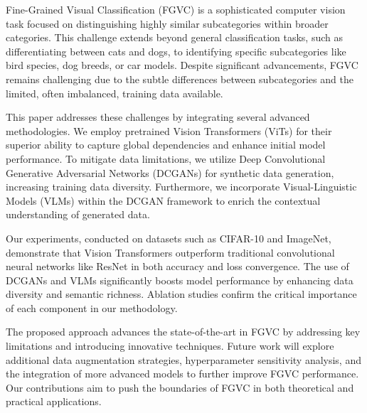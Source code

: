 \begin{onecolabstract}
    Fine-Grained Visual Classification (FGVC) is a sophisticated computer vision task focused on distinguishing highly similar subcategories within broader categories. This challenge extends beyond general classification tasks, such as differentiating between cats and dogs, to identifying specific subcategories like bird species, dog breeds, or car models. Despite significant advancements, FGVC remains challenging due to the subtle differences between subcategories and the limited, often imbalanced, training data available.

    This paper addresses these challenges by integrating several advanced methodologies. We employ pretrained Vision Transformers (ViTs) for their superior ability to capture global dependencies and enhance initial model performance. To mitigate data limitations, we utilize Deep Convolutional Generative Adversarial Networks (DCGANs) for synthetic data generation, increasing training data diversity. Furthermore, we incorporate Visual-Linguistic Models (VLMs) within the DCGAN framework to enrich the contextual understanding of generated data.

    Our experiments, conducted on datasets such as CIFAR-10 and ImageNet, demonstrate that Vision Transformers outperform traditional convolutional neural networks like ResNet in both accuracy and loss convergence. The use of DCGANs and VLMs significantly boosts model performance by enhancing data diversity and semantic richness. Ablation studies confirm the critical importance of each component in our methodology.

    The proposed approach advances the state-of-the-art in FGVC by addressing key limitations and introducing innovative techniques. Future work will explore additional data augmentation strategies, hyperparameter sensitivity analysis, and the integration of more advanced models to further improve FGVC performance. Our contributions aim to push the boundaries of FGVC in both theoretical and practical applications.

\end{onecolabstract}
